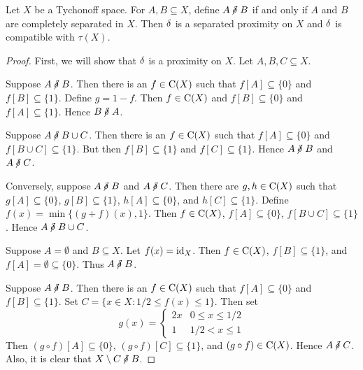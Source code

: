 \begin{theorem}
	\label{tychdeltacs}
	Let \( X \) be a Tychonoff space.  For \( A,B \subseteq X \), define \( A \nnear B \) if and only if \( A \) and \( B \) are completely separated in \( X \).  Then \( \mathord{\delta} \) is a separated proximity on \( X \) and \( \mathord{\delta} \) is compatible with \( \tau(X) \).
\end{theorem}
\begin{proof}
	First, we will show that \( \mathbin{\delta} \) is a proximity on \( X \).  Let \( A,B,C \subseteq X \).
	
	 Suppose \( A \nnear B \).  Then there is an \( f \in \operatorname{C}(X) \) such that \( f[A] \subseteq \{0\} \) and \( f[B] \subseteq \{1\} \).  Define \( g=1-f \).  Then \( f \in \operatorname{C}(X) \) and \( f[B] \subseteq \{0\} \) and \( f[A] \subseteq \{1\} \).  Hence \( B \nnear A \).
	
	 Suppose \( A \nnear B \cup C \).  Then there is an \( f \in \operatorname{C}(X) \) such that \( f[A] \subseteq \{0\} \) and \( f[B \cup C] \subseteq \{1\} \).  But then \( f[B] \subseteq \{ 1 \} \) and \( f[C] \subseteq \{ 1 \} \).  Hence \( A \nnear B \) and \( A \nnear C \).
	
		Conversely, suppose \( A \nnear B \) and \( A \nnear C \).  Then there are \( g,h \in \operatorname{C}(X) \) such that \( g[A] \subseteq \{0\} \), \( g[B] \subseteq \{1\} \), \( h[A] \subseteq \{0\} \), and \( h[C] \subseteq \{1\} \).  Define \( f(x) = \min\{(g+f)(x),1\} \).  Then \( f \in \operatorname{C}(X) \), \( f[A] \subseteq \{0\} \), \( f[B \cup C] \subseteq \{1\} \).  Hence \( A \nnear B \cup C \).
	
	 Suppose \( A = \emptyset \) and \( B \subseteq X \).  Let \( f(x) = \operatorname{id}_X \).  Then \( f \in \operatorname{C}(X) \), \( f[B] \subseteq \{1\} \), and \( f[A] = \emptyset \subseteq \{0\} \).  Thus \( A \nnear B \).
	
	 Suppose \( A \nnear B \).  Then there is an \( f \in \operatorname{C}(X) \) such that \( f[A] \subseteq \{0\} \) and \( f[B] \subseteq \{1\} \).  Set \( C = \{ x \in X : 1/2 \leq f(x) \leq 1 \} \).  Then set
		\begin{displaymath} 
			g(x) = \left\{
				\begin{array}{lr} 
				2x & 0 \leq x \leq 1/2 \\
				1 & 1/2 < x \leq 1
				\end{array}
			\right.
		\end{displaymath}
		Then \( (g \circ f)[A] \subseteq \{0\} \), \( (g \circ f)[C] \subseteq \{1\} \), and \( (g \circ f) \in \operatorname{C}(X) \).  Hence \( A \nnear C \).  Also, it is clear that \( X \setminus C \nnear B \).
	

\end{proof}
